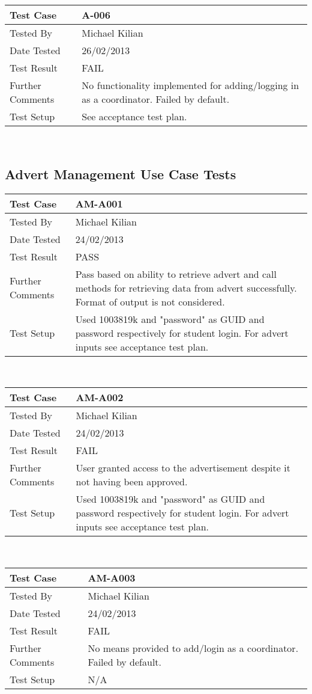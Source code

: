 \documentclass{l3deliverable}
\begin{document}
\begin{tabular}{lp{10cm}}
\hline 
\textbf{Test Case} & A-006\tabularnewline
\hline 
\hline 
Tested By & Michael Kilian\tabularnewline
\hline 
Date Tested & 26/02/2013\tabularnewline
\hline 
Test Result & FAIL\tabularnewline
\hline
Further Comments &  No functionality implemented for adding/logging in as a coordinator. Failed by default. \tabularnewline
\hline
Test Setup &  See acceptance test plan. \tabularnewline
\hline
\end{tabular}\\


\subsection{Advert Management Use Case Tests}
\begin{tabular}{lp{10cm}}
\hline 
\textbf{Test Case} & AM-A001\tabularnewline
\hline 
\hline 
Tested By & Michael Kilian\tabularnewline
\hline 
Date Tested & 24/02/2013\tabularnewline
\hline 
Test Result & PASS\tabularnewline
\hline
Further Comments & Pass based on ability to retrieve advert and call methods for retrieving data from advert successfully. Format of output is not considered. \tabularnewline
\hline
Test Setup & Used 1003819k and "password" as GUID and password respectively for student login. For advert inputs see acceptance test plan. \tabularnewline
\hline
\end{tabular}\\

\begin{tabular}{lp{10cm}}
\hline 
\textbf{Test Case} & AM-A002\tabularnewline
\hline 
\hline 
Tested By & Michael Kilian\tabularnewline
\hline 
Date Tested & 24/02/2013\tabularnewline
\hline 
Test Result & FAIL\tabularnewline
\hline
Further Comments & User granted access to the advertisement despite it not having been approved.\tabularnewline
\hline
Test Setup & Used 1003819k and "password" as GUID and password respectively for student login. For advert inputs see acceptance test plan. \tabularnewline
\hline
\end{tabular}\\

\begin{tabular}{lp{10cm}}
\hline 
\textbf{Test Case} & AM-A003\tabularnewline
\hline 
\hline 
Tested By & Michael Kilian\tabularnewline
\hline 
Date Tested & 24/02/2013\tabularnewline
\hline 
Test Result & FAIL\tabularnewline
\hline
Further Comments & No means provided to add/login as a coordinator. Failed by default.\tabularnewline
\hline
Test Setup & N/A \tabularnewline
\hline
\end{tabular}\\
\end{document}
